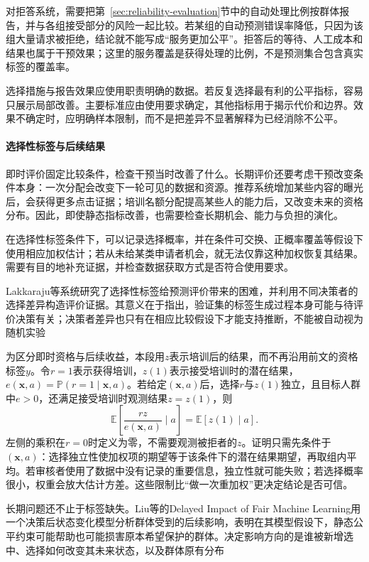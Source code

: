 对拒答系统，需要把第~\ref{sec:reliability-evaluation}节中的自动处理比例按群体报告，并与各组接受部分的风险一起比较。若某组的自动预测错误率降低，只因为该组大量请求被拒绝，结论就不能写成“服务更加公平”。拒答后的等待、人工成本和结果也属于干预效果；这里的服务覆盖是获得处理的比例，不是预测集合包含真实标签的覆盖率。

选择措施与报告效果应使用职责明确的数据。若反复选择最有利的公平指标，容易只展示局部改善。主要标准应由使用要求确定，其他指标用于揭示代价和边界。效果不确定时，应明确样本限制，而不是把差异不显著解释为已经消除不公平。

\paragraph{选择性标签与后续结果}

即时评价固定比较条件，检查干预当时改善了什么。长期评价还要考虑干预改变条件本身：一次分配会改变下一轮可见的数据和资源。推荐系统增加某些内容的曝光后，会获得更多点击证据；培训名额分配提高某些人的能力后，又改变未来的资格分布。因此，即使静态指标改善，也需要检查长期机会、能力与负担的演化。

在选择性标签条件下，可以记录选择概率，并在条件可交换、正概率覆盖等假设下使用相应加权估计；若从未给某类申请者机会，就无法仅靠这种加权恢复其结果。需要有目的地补充证据，并检查数据获取方式是否符合使用要求。

Lakkaraju等系统研究了选择性标签给预测评价带来的困难，并利用不同决策者的选择差异构造评价证据。其意义在于指出，验证集的标签生成过程本身可能与待评价决策有关；决策者差异也只有在相应比较假设下才能支持推断，不能被自动视为随机实验

为区分即时资格与后续收益，本段用$z$表示培训后的结果，而不再沿用前文的资格标签$y$。令$r=1$表示获得培训，$z(1)$表示接受培训时的潜在结果，$e(\bm{x},a)=\mathbb P(r=1\mid\bm{x},a)$。若给定$(\bm{x},a)$后，选择$r$与$z(1)$独立，且目标人群中$e>0$，还满足接受培训时观测结果$z=z(1)$，则
\begin{equation}
 \mathbb E\!\left[\frac{r z}{e(\bm{x},a)}\mid a\right]
 =\mathbb E[z(1)\mid a].
 \label{eq:fairness-selective-weight}
\end{equation}
左侧的乘积在$r=0$时定义为零，不需要观测被拒者的$z$。证明只需先条件于$(\bm{x},a)$：选择独立性使加权项的期望等于该条件下的潜在结果期望，再取组内平均。若审核者使用了数据中没有记录的重要信息，独立性就可能失败；若选择概率很小，权重会放大估计方差。这些限制比“做一次重加权”更决定结论是否可信。

长期问题还不止于标签缺失。Liu等的Delayed Impact of Fair Machine Learning用一个决策后状态变化模型分析群体受到的后续影响，表明在其模型假设下，静态公平约束可能帮助也可能损害原本希望保护的群体。决定影响方向的是谁被新增选中、选择如何改变其未来状态，以及群体原有分布


